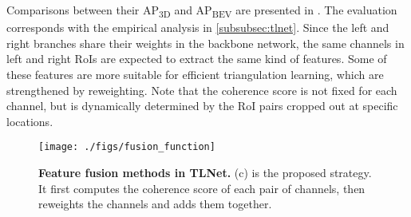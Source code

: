 Comparisons between their AP\textsubscript{3D} and AP\textsubscript{BEV} are presented in \tab{\ref{tab:3dapnorew}}. The evaluation corresponds with the empirical analysis in \ref{subsubsec:tlnet}. Since the left and right branches share their weights in the backbone network, the same channels in left and right RoIs are expected to extract the same kind of features. Some of these features are more suitable for efficient triangulation learning, which are strengthened by reweighting. Note that the coherence score  is not fixed for each channel, but is dynamically determined by the RoI pairs cropped out at specific locations.


	
	
\begin{figure}[!htbp]
	\centering
\texttt{[image: ./figs/fusion\_function]}
	\caption{\textbf{Feature fusion methods in TLNet.} (c) is the proposed strategy. It first computes the coherence score of each pair of channels, then reweights the channels and adds them together.}
	\label{fig:fusion}
\end{figure}
